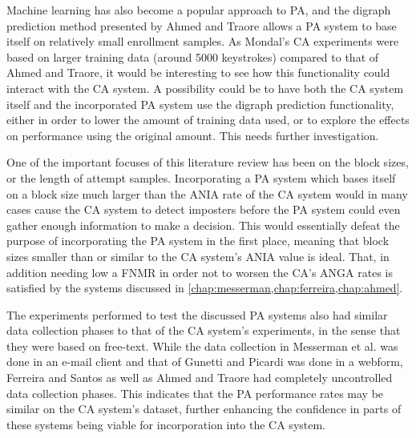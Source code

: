 \documentclass[informationsecurity]{gucmasterproject}
\begin{document}
Machine learning has also become a popular approach to PA, and the digraph prediction method presented by Ahmed and Traore \cite{Ahmed} allows a PA system to base itself on relatively small enrollment samples.
As Mondal's \cite{mondal} CA experiments were based on larger training data (around 5000 keystrokes) compared to that of Ahmed and Traore, it would be interesting to see how this functionality could interact with the CA system.
A possibility could be to have both the CA system itself and the incorporated PA system use the digraph prediction functionality, either in order to lower the amount of training data used, or to explore the effects on performance using the original amount. 
This needs further investigation.

One of the important focuses of this literature review has been on the block sizes, or the length of attempt samples.
Incorporating a PA system which bases itself on a block size much larger than the ANIA rate of the CA system would in many cases cause the CA system to detect imposters before the PA system could even gather enough information to make a decision.
This would essentially defeat the purpose of incorporating the PA system in the first place, meaning that block sizes smaller than or similar to the CA system's ANIA value is ideal.
That, in addition needing low a FNMR in order not to worsen the CA's ANGA rates is satisfied by the systems discussed in \cref{chap:messerman,chap:ferreira,chap:ahmed}.

The experiments performed to test the discussed PA systems also had similar data collection phases to that of the CA system's experiments, in the sense that they were based on free-text.
While the data collection in Messerman et al. \cite{Messerman} was done in an e-mail client and that of Gunetti and Picardi \cite{gnp} was done in a webform, Ferreira and Santos \cite{superResults} as well as Ahmed and Traore \cite{Ahmed} had completely uncontrolled data collection phases.
This indicates that the PA performance rates may be similar on the CA system's dataset, further enhancing the confidence in parts of these systems being viable for incorporation into the CA system.
\end{document}

